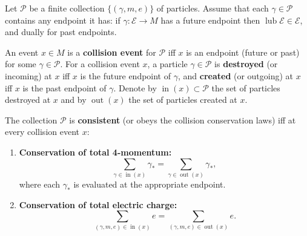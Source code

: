 Let $\mathcal{P}$ be a finite collection $\{(\gamma, m, e)\}$ of particles. Assume that each $\gamma \in \mathcal{P}$ contains any endpoint it has: if $\gamma: \mathcal{E} \rightarrow M$ has a future endpoint then $\operatorname{lub} \mathcal{E} \in \mathcal{E}$, and dually for past endpoints.

An event $x \in M$ is a \textbf{collision event} for $\mathcal{P}$ iff $x$ is an endpoint (future or past) for some $\gamma \in \mathcal{P}$. For a collision event $x$, a particle $\gamma \in \mathcal{P}$ is \textbf{destroyed} (or incoming) at $x$ iff $x$ is the future endpoint of $\gamma$, and \textbf{created} (or outgoing) at $x$ iff $x$ is the past endpoint of $\gamma$. Denote by $\operatorname{in}(x) \subset \mathcal{P}$ the set of particles destroyed at $x$ and by $\operatorname{out}(x)$ the set of particles created at $x$.

The collection $\mathcal{P}$ is \textbf{consistent} (or obeys the collision conservation laws) iff at every collision event $x$:
\begin{enumerate}
\item[(a)] \textbf{Conservation of total 4-momentum:}
$$\sum_{\gamma \in \operatorname{in}(x)} \gamma_* = \sum_{\gamma \in \operatorname{out}(x)} \gamma_*,$$
where each $\gamma_*$ is evaluated at the appropriate endpoint.
\item[(b)] \textbf{Conservation of total electric charge:}
$$\sum_{(\gamma,m,e) \in \operatorname{in}(x)} e = \sum_{(\gamma,m,e) \in \operatorname{out}(x)} e.$$
\end{enumerate}
